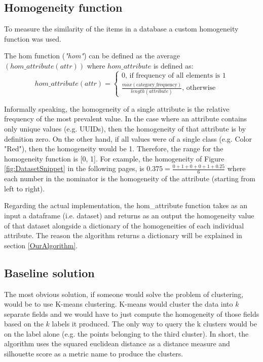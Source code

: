 \documentclass[sigconf]{acmart}
\begin{document}
\subsection{Homogeneity function}\label{HomFunction}
To measure the similarity of the items in a database a custom homogeneity function was used. 

The hom function (\textit{"hom"}) can be defined as the average $(hom\_attribute(attr))$ where $hom\_attribute$ is defined as:\begin{equation}
    hom\_attribute(attr) = \begin{cases} 0 \text{, if frequency of all elements is 1} \\ \frac{max(\text{category\_frequency})}{length(attribute)} \text{, otherwise}\end{cases} 
\end{equation}

Informally speaking, the homogeneity of a single attribute is the relative frequency of the most prevalent value. In the case where an attribute contains only unique values (e.g. UUIDs), then the homogeneity of that attribute is by definition zero. On the other hand, if all values were of a single class (e.g. Color "Red"), then the homogeneity would be 1. Therefore, the range for the homogeneity function is [0, 1]. For example, the homogeneity of Figure \ref{fig:DatasetSnippet} in the following pages, is $0.375=\frac{0+1+0+0+1+0.25}{6}$ where each number in the nominator is the homogeneity of the attribute (starting from left to right).

Regarding the actual implementation, the hom\_attribute function takes as an input a dataframe (i.e. dataset) and returns as an output the homogeneity value of that dataset alongside a dictionary of the homogeneities of each individual attribute. The reason the algorithm returns a dictionary will be explained in section \ref{OurAlgorithm}.





\subsection{Baseline solution}\label{BaselineSolution}
The most obvious solution, if someone would solve the problem of clustering, would be to use K-means clustering. K-means would cluster the data into $k$ separate fields and we would have to just compute the homogeneity of those fields based on the $k$ labels it produced. The only way to query the k clusters would be on the label alone (e.g. the points belonging to the third cluster). In short, the algorithm uses the squared euclidean distance as a distance measure and silhouette score as a metric name to produce the clusters.
\end{document}
